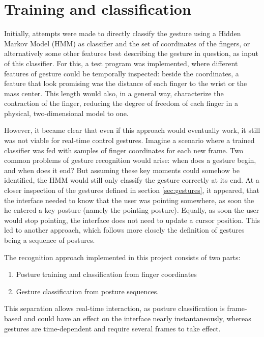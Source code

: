 \section{Training and classification}
\label{sec:training-and-classification}

Initially, attempts were made to directly classify the gesture using a Hidden Markov Model (HMM) as classifier and the set of coordinates of the fingers, or alternatively some other features best describing the gesture in question, as input of this classifier. For this, a test program was implemented, where different features of gesture could be temporally inspected: beside the coordinates, a feature that look promising was the distance of each finger to the wrist or the mass center. This length would also, in a general way, characterize the contraction of the finger, reducing the degree of freedom of each finger in a physical, two-dimensional model to one.

However, it became clear that even if this approach would eventually work, it still was not viable for real-time control gestures. Imagine a scenario where a trained classifier was fed with samples of finger coordinates for each new frame. Two common problems of gesture recognition would arise: when does a gesture begin, and when does it end? But assuming these key moments could somehow be identified, the HMM would still only classify the gesture correctly at its end. At a closer inspection of the gestures defined in section \ref{sec:gestures}, it appeared, that the interface needed to know that the user was pointing somewhere, as soon the he entered a key posture (namely the pointing posture). Equally, as soon the user would stop pointing, the interface does not need to update a cursor position. This led to another approach, which follows more closely the definition of gestures being a sequence of postures.

The recognition approach implemented in this project consists of two parts: 
\begin{enumerate}
\item Posture training and classification from finger coordinates
\item Gesture classification from posture sequences.
\end{enumerate}
This separation allows real-time interaction, as posture classification is frame-based and could have an effect on the interface nearly instantaneously, whereas gestures are time-dependent and require several frames to take effect.

